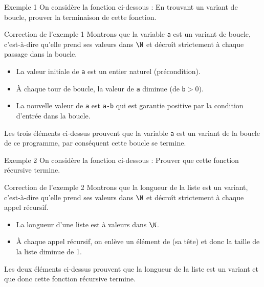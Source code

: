 \documentclass[10pt]{beamer}
\begin{document}
\begin{frame}[fragile]{\Ctitle}{\stitle}
	\begin{exampleblock}{Exemple 1}
		On considère la fonction ci-dessous :
		\onslide<2-> En trouvant un variant de boucle, prouver la terminaison de cette fonction.
	\end{exampleblock}
\end{frame}

\begin{frame}[fragile]{\Ctitle}{\stitle}
	\begin{exampleblock}{Correction de l'exemple 1}
		\textcolor{OliveGreen}{Montrons que la variable {\tt a} est un variant de boucle, c'est-à-dire qu'elle prend ses valeurs dans $\N$ et décroît strictement à chaque passage dans la boucle.}
		\begin{itemize}
			\item<2->{\textcolor{OliveGreen}{La valeur initiale de \texttt{a} est un entier naturel (précondition).}}
			\item<3->{\textcolor{OliveGreen}{À chaque tour de boucle, la valeur de \texttt{a} diminue (de \texttt{b}$>0$).}}
			\item<4->{\textcolor{OliveGreen}{La nouvelle valeur de \texttt{a} est \texttt{a-b} qui est garantie positive par la condition d'entrée dans la boucle.}}
		\end{itemize}
		\textcolor{OliveGreen}{Les trois éléments ci-dessus prouvent que la variable {\tt a} est un variant de la boucle  de ce programme, par conséquent cette boucle se termine.}
	\end{exampleblock}
\end{frame}

\begin{frame}[fragile]{\Ctitle}{\stitle}
	\begin{exampleblock}{Exemple 2}
		On considère la fonction ci-dessous :
		\onslide<2-> Prouver que cette fonction récursive termine.
	\end{exampleblock}
\end{frame}

\begin{frame}[fragile]{\Ctitle}{\stitle}
	\begin{exampleblock}{Correction de l'exemple 2}
		\textcolor{OliveGreen}{Montrons que la longueur de la liste  est un variant, c'est-à-dire qu'elle prend ses valeurs dans $\N$ et décroît strictement à chaque appel récursif.}
		\begin{itemize}
			\item<2->{\textcolor{OliveGreen}{La longueur d'une liste est à valeurs dans $\N$.}}
			\item<3->{\textcolor{OliveGreen}{À chaque appel récursif, on enlève un élément de  (sa tête) et donc la taille de la liste diminue de 1.}}
		\end{itemize}
		\textcolor{OliveGreen}{Les deux éléments ci-dessus prouvent que la longueur de la liste est un variant et que donc cette fonction récursive termine.}
	\end{exampleblock}
\end{frame}
\end{document}

